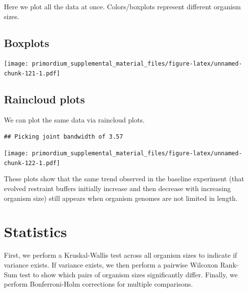\documentclass[
]{book}
\begin{document}
Here we plot all the data at once.
Colors/boxplots represent different organism sizes.

\hypertarget{boxplots-1}{%
\subsection{Boxplots}\label{boxplots-1}}

\texttt{[image: primordium\_supplemental\_material\_files/figure-latex/unnamed-chunk-121-1.pdf]}

\hypertarget{raincloud-plots-1}{%
\subsection{Raincloud plots}\label{raincloud-plots-1}}

We can plot the same data via raincloud plots.

\begin{verbatim}
## Picking joint bandwidth of 3.57
\end{verbatim}

\texttt{[image: primordium\_supplemental\_material\_files/figure-latex/unnamed-chunk-122-1.pdf]}

These plots show that the same trend observed in the baseline experiment (that evolved restraint buffers initially increase and then decrease with increasing organism size) still appears when organism genomes are not limited in length.

\hypertarget{statistics-7}{%
\section{Statistics}\label{statistics-7}}

First, we perform a Kruskal-Wallis test across all organism sizes to indicate if variance exists.
If variance exists, we then perform a pairwise Wilcoxon Rank-Sum test to show which pairs of organism sizes significantly differ.
Finally, we perform Bonferroni-Holm corrections for multiple comparisons.
\end{document}
